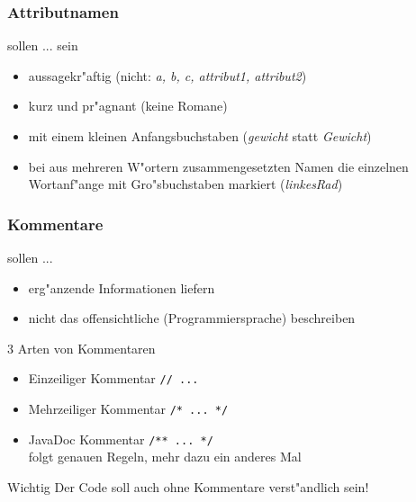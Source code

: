 \documentclass{beamer}
\begin{document}
\begin{frame}
\frametitle{Attributnamen}
\begin{block}{sollen ... sein}
\begin{itemize}
\item aussagekr"aftig (nicht: \textit{a, b, c, attribut1, attribut2})\\
\item kurz und pr"agnant (keine Romane)\\
\item mit einem kleinen Anfangsbuchstaben (\textit{gewicht} statt \textit{Gewicht})\\
\item bei aus mehreren W"ortern zusammengesetzten Namen die einzelnen Wortanf"ange mit Gro"sbuchstaben markiert (\textit{linkesRad})
\end{itemize}
\end{block}
\end{frame}


\begin{frame}
\frametitle{Kommentare}
\begin{block}{sollen ...}
\begin{itemize}
\item erg"anzende Informationen liefern\\
\item nicht das offensichtliche (Programmiersprache) beschreiben
\end{itemize}
\end{block}

\pause

\begin{block}{3 Arten von Kommentaren}
\begin {itemize}
\item Einzeiliger Kommentar \lstinline|// ...|\\
\item Mehrzeiliger Kommentar \lstinline|/* ... */|\\
\item JavaDoc Kommentar \lstinline|/** ... */|\\
folgt genauen Regeln, mehr dazu ein anderes Mal
\end{itemize}
\end{block}

\pause

\begin{block}{Wichtig}
\alert{Der Code soll auch ohne Kommentare verst"andlich sein!}
\end{block}
\end{frame}
\end{document}
